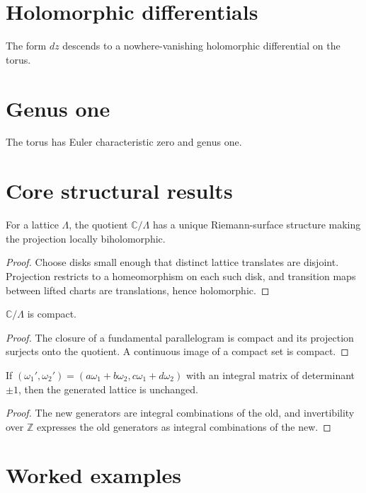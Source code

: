 \section{Holomorphic differentials}
The form $dz$ descends to a nowhere-vanishing holomorphic differential on the torus.

\section{Genus one}
The torus has Euler characteristic zero and genus one.

\section{Core structural results}

\begin{theorem}\label{thm:iv27-01}
For a lattice $\Lambda$, the quotient $\mathbb C/\Lambda$ has a unique Riemann-surface structure making the projection locally biholomorphic.
\begin{proof}
Choose disks small enough that distinct lattice translates are disjoint. Projection restricts to a homeomorphism on each such disk, and transition maps between lifted charts are translations, hence holomorphic.
\end{proof}
\end{theorem}

\begin{theorem}\label{thm:iv27-02}
$\mathbb C/\Lambda$ is compact.
\begin{proof}
The closure of a fundamental parallelogram is compact and its projection surjects onto the quotient. A continuous image of a compact set is compact.
\end{proof}
\end{theorem}

\begin{theorem}\label{thm:iv27-03}
If $(\omega_1',\omega_2')=(a\omega_1+b\omega_2,c\omega_1+d\omega_2)$ with an integral matrix of determinant $\pm1$, then the generated lattice is unchanged.
\begin{proof}
The new generators are integral combinations of the old, and invertibility over $\mathbb Z$ expresses the old generators as integral combinations of the new.
\end{proof}
\end{theorem}

\section{Worked examples}

